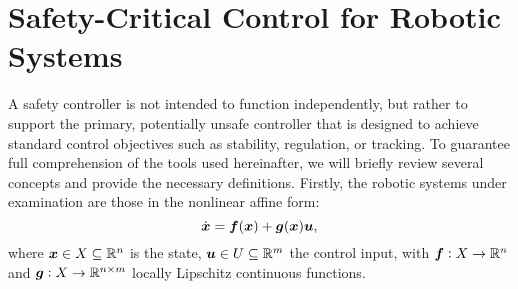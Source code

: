 




\section{Safety-Critical Control for Robotic Systems}\label{sec:cbf}
A safety controller is not intended to function independently, but rather to support the primary, potentially unsafe controller that is designed to achieve standard control objectives such as stability, regulation, or tracking. To guarantee full comprehension of the tools used hereinafter, we will briefly review several concepts and provide the necessary definitions. 
Firstly, the robotic systems under examination are those in the nonlinear affine form:
\begin{equation}
    \dot{\boldsymbol{x}}=\boldsymbol{f}(\boldsymbol{x})+\boldsymbol{g}(\boldsymbol{x})\boldsymbol{u},
    \label{eq:system}
\end{equation}
where $\boldsymbol{x}\in X\subseteq \mathbb{R}^n$ is the state, $\boldsymbol{u}\in U \subseteq \mathbb{R}^m$ the control input, with $\boldsymbol{f} : X\to\mathbb{R}^n$ and $\boldsymbol{g} : X\to\mathbb{R}^{n\times m} $ locally Lipschitz continuous functions. 
